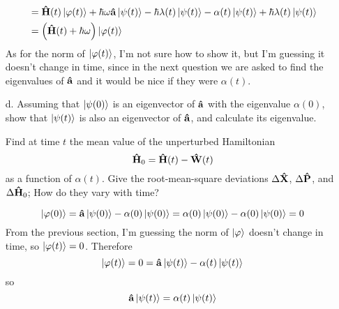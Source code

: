\documentclass[a4paper,twoside]{article}
\begin{document}
\begin{itemize}
\begin{problem}
\begin{align}
                &= \vu{H}(t)\ket{\varphi(t)} + \hbar \omega \vu{a}\ket{\psi(t)} - \hbar \lambda(t)\ket{\psi(t)} - \alpha(t)\ket{\psi(t)} + \hbar \lambda(t)\ket{\psi(t)} \\
                &= \left( \vu{H}(t) + \hbar \omega \right)\ket{\varphi(t)}
            \end{align}
            As for the norm of $\ket{\varphi(t)} $, I'm not sure how to show it, but I'm guessing it doesn't change in time, since in the next question we are asked to find the eigenvalues of $ \vu{a} $ and it would be nice if they were $ \alpha(t) $.
        \end{problem}
    \item[d.] Assuming that $\ket{\psi(0)} $ is an eigenvector of $ \vu{a} $ with the eigenvalue $ \alpha(0) $, show that $\ket{\psi(t)} $ is also an eigenvector of $ \vu{a} $, and calculate its eigenvalue.

        Find at time $ t $ the mean value of the unperturbed Hamiltonian
        \begin{equation}
            \vu{H}_0 = \vu{H}(t) - \vu{W}(t)
        \end{equation}
        as a function of $ \alpha(t) $. Give the root-mean-square deviations $ \Delta \vu{X} $, $ \Delta \vu{P} $, and $ \Delta \vu{H}_0 $; How do they vary with time?
        \begin{problem}
            \begin{equation}
                \ket{\varphi(0)} = \vu{a}\ket{\psi(0)} - \alpha(0)\ket{\psi(0)} = \alpha(0)\ket{\psi(0)} - \alpha(0)\ket{\psi(0)} = 0
            \end{equation}
            From the previous section, I'm guessing the norm of $\ket{\varphi} $  doesn't change in time, so $\ket{\varphi(t)} = 0 $. Therefore
            \begin{equation}
                \ket{\varphi(t)} = 0 = \vu{a}\ket{\psi(t)} - \alpha(t)\ket{\psi(t)}
            \end{equation}
            so
            \begin{equation}
                \vu{a}\ket{\psi(t)} = \alpha(t)\ket{\psi(t)} 
            \end{equation}


\end{problem}
\end{itemize}
\end{document}
